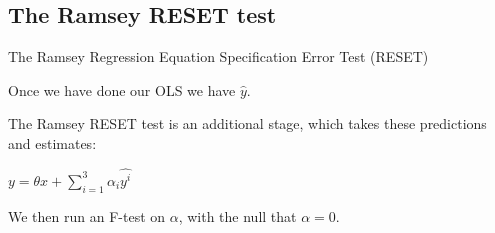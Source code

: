 
\subsection{The Ramsey RESET test}

The Ramsey Regression Equation Specification Error Test (RESET)

Once we have done our OLS we have \(\hat y\).

The Ramsey RESET test is an additional stage, which takes these predictions and estimates:

\(y=\theta x+\sum_{i=1}^3\alpha_i \hat {y^i}\)

We then run an F-test on \(\alpha\), with the null that \(\alpha = 0\).

